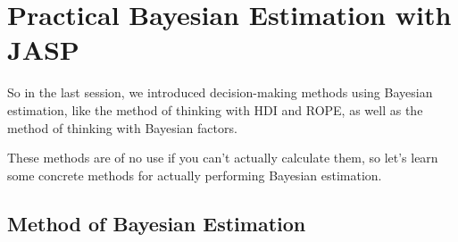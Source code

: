 \documentclass{ltjbook}
\begin{document}
\VerbatimFootnotes
\chapter{Practical Bayesian Estimation with JASP}

\label{m28_jasp}
So in the last session, we introduced decision-making methods using Bayesian estimation, like the method of thinking with HDI and ROPE, as well as the method of thinking with Bayesian factors.

These methods are of no use if you can't actually calculate them, so let's learn some concrete methods for actually performing Bayesian estimation.
\section{Method of Bayesian Estimation}
\end{document}
